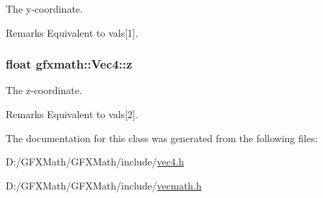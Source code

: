 The y-\/coordinate. 

\begin{DoxyRemark}{Remarks}
Equivalent to vals\mbox{[}1\mbox{]}. 
\end{DoxyRemark}
\hypertarget{classgfxmath_1_1_vec4_acd626b757468a5ea39f98812a36c4419}{}
\subsubsection[{z}]{\setlength{\rightskip}{0pt plus 5cm}float gfxmath\+::\+Vec4\+::z}\label{classgfxmath_1_1_vec4_acd626b757468a5ea39f98812a36c4419}


The z-\/coordinate. 

\begin{DoxyRemark}{Remarks}
Equivalent to vals\mbox{[}2\mbox{]}. 
\end{DoxyRemark}


The documentation for this class was generated from the following files\+:\begin{DoxyCompactItemize}
\item 
D\+:/\+G\+F\+X\+Math/\+G\+F\+X\+Math/include/\hyperlink{vec4_8h}{vec4.\+h}\item 
D\+:/\+G\+F\+X\+Math/\+G\+F\+X\+Math/include/\hyperlink{vecmath_8h}{vecmath.\+h}\end{DoxyCompactItemize}
